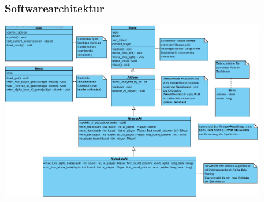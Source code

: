 



\begin{frame}
\frametitle{Softwarearchitektur}

\includegraphics[width=11cm]{fig/4connect.png}

\end{frame}
